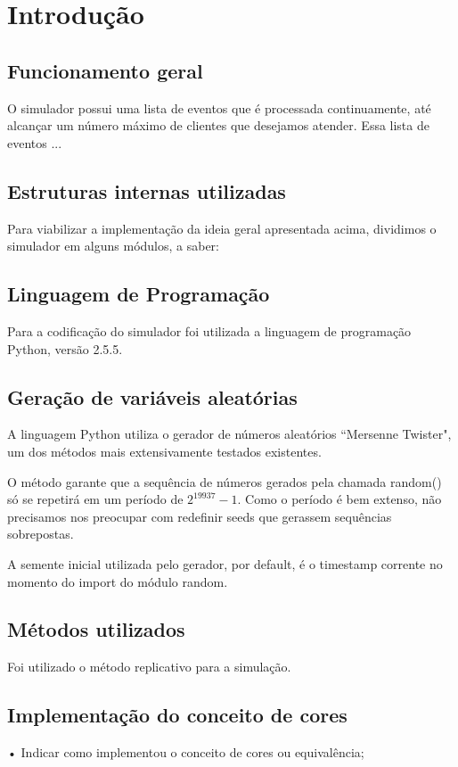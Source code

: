 \chapter{Introdução}
\section{Funcionamento geral}
O simulador possui uma lista de eventos que é processada continuamente, até alcançar um número máximo de clientes que desejamos atender.
Essa lista de eventos ...

\section{Estruturas internas utilizadas}
Para viabilizar a implementação da ideia geral apresentada acima, dividimos o simulador em alguns módulos, a saber:

\section{Linguagem de Programação}
Para a codificação do simulador foi utilizada a linguagem de programação Python, versão 2.5.5.

\section{Geração de variáveis aleatórias}
A linguagem Python utiliza o gerador de números aleatórios ``Mersenne Twister", um dos métodos mais extensivamente testados existentes. 

O método garante que a sequência de números gerados pela chamada random() só se repetirá em um período de $2^{19937}-1$. Como o período é bem extenso, não precisamos nos preocupar com redefinir seeds que gerassem sequências sobrepostas.

A semente inicial utilizada pelo gerador, por default, é o timestamp corrente no momento do import do módulo random.

\section{Métodos utilizados}
Foi utilizado o método replicativo para a simulação.

\section{Implementação do conceito de cores}
• Indicar como implementou o conceito de cores ou equivalência;

